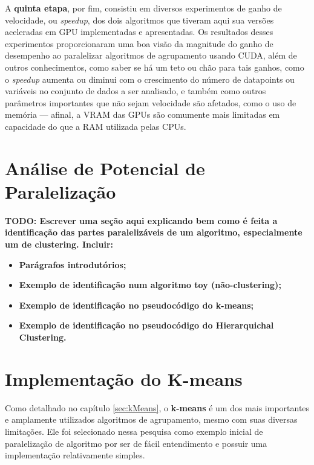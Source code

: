 \documentclass[12pt,
openright, 
oneside, %
a4paper,    %
brazil]{facom-ufu-abntex2}
\def\qntAlgrtm{dois}
\begin{document}
A \textbf{quinta etapa}, por fim, consistiu em diversos experimentos de ganho de velocidade, ou \textit{speedup}, dos \qntAlgrtm{} algoritmos que tiveram aqui sua versões aceleradas em GPU implementadas e apresentadas. Os resultados desses experimentos proporcionaram uma boa visão da magnitude do ganho de desempenho ao paralelizar algoritmos de agrupamento usando CUDA, além de outros conhecimentos, como saber se há um teto ou chão para tais ganhos, como o \textit{speedup} aumenta ou diminui com o crescimento do número de datapoints ou variáveis no conjunto de dados a ser analisado, e também como outros parâmetros importantes que não sejam velocidade são afetados, como o uso de memória --- afinal, a VRAM das GPUs são comumente mais limitadas em capacidade do que a RAM utilizada pelas CPUs.




\section{Análise de Potencial de Paralelização}
\label{chp:analisePotencParalel}

\textbf{TODO: Escrever uma seção aqui explicando bem como é feita a identificação das partes paralelizáveis de um algoritmo, especialmente um de clustering. Incluir:}

\begin{itemize}
  \item \textbf{Parágrafos introdutórios;}

  \item \textbf{Exemplo de identificação num algoritmo toy (não-clustering);}

  \item \textbf{Exemplo de identificação no pseudocódigo do k-means;}

  \item \textbf{Exemplo de identificação no pseudocódigo do Hierarquichal Clustering.}
\end{itemize}




\section{Implementação do K-means}
\label{sec:kMeansImplementações}

Como detalhado no capítulo \ref{sec:kMeans}, o \textbf{k-means} é um dos mais importantes e amplamente utilizados algoritmos de agrupamento, mesmo com suas diversas limitações. Ele foi selecionado nessa pesquisa como exemplo inicial de paralelização de algoritmo por ser de fácil entendimento e possuir uma implementação relativamente simples.
\end{document}
